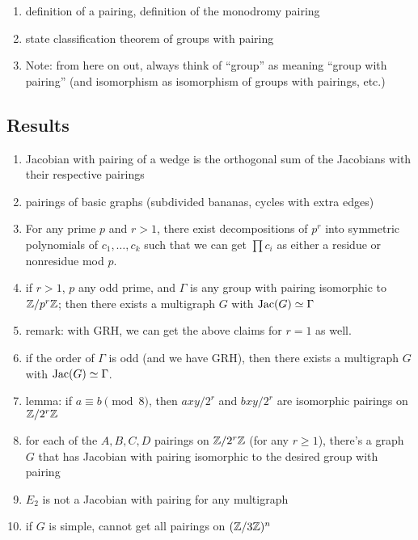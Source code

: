 \documentclass{amsart}
\begin{document}
\begin{enumerate}

\item definition of a pairing, definition of the monodromy pairing

\item state classification theorem of groups with pairing

\item Note: from here on out, always think of ``group'' as meaning
  ``group with pairing'' (and isomorphism as isomorphism of groups
  with pairings, etc.)
\end{enumerate}

\subsection{Results}

\begin{enumerate}

\item Jacobian with pairing of a wedge is the orthogonal sum of the
Jacobians with their respective pairings

\item pairings of basic graphs (subdivided bananas, cycles with extra
edges)

\item For any prime $p$ and $r>1$, there exist decompositions of $p^r$
  into symmetric polynomials of $c_1, \ldots, c_k$ such that we can
  get $\prod c_i$ as either a residue or nonresidue mod $p$.

\item if $r>1$, $p$ any odd prime, and $\Gamma$ is any group with
pairing isomorphic to $\mathbb{Z}/p^r\mathbb{Z}$; then there exists a multigraph $G$
with $\operatorname{Jac}(G)\simeq \Gamma$

\item remark: with GRH, we can get the above claims for $r=1$ as well.

\item if the order of $\Gamma$ is odd (and we have GRH), then there
exists a multigraph $G$ with $\operatorname{Jac}(G) \simeq \Gamma$.

\item lemma: if $a\equiv b\pmod 8$, then $axy/2^r$ and $bxy/2^r$ are
isomorphic pairings on $\mathbb{Z}/2^r\mathbb{Z}$

\item for each of the $A,B,C,D$ pairings on $\mathbb{Z}/2^r\mathbb{Z}$ (for any
$r\ge1$), there's a graph $G$ that has Jacobian with pairing
isomorphic to the desired group with pairing

\item $E_2$ is not a Jacobian with pairing for any multigraph

\item if $G$ is simple, cannot get all pairings on $(\mathbb{Z}/3\mathbb{Z})^n$
\end{enumerate}
\end{document}
